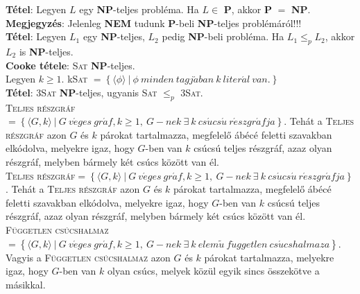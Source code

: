 \documentclass[margin=0px]{article}
\begin{document}
	\noindent \textbf{Tétel}: Legyen $L$ egy \textbf{NP}-teljes probléma. Ha $L \in$ \textbf{P}, akkor \textbf{P} $=$ \textbf{NP}.\\
	
	\noindent \textbf{Megjegyzés}: Jelenleg \textbf{NEM} tudunk \textbf{P}-beli \textbf{NP}-teljes problémáról!!!\\
	
	\noindent \textbf{Tétel}: Legyen $L_{1}$ egy \textbf{NP}-teljes, $L_{2}$ pedig \textbf{NP}-beli probléma.
	Ha $L_{1} \leq_{p} L_{2}$, akkor $L_{2}$ is \textbf{NP}-teljes.\\
	
	\noindent \textbf{Cooke tétele}: \textsc{Sat} \textbf{NP}-teljes.\\
	
	\noindent Legyen $k \geq 1$.
	k\textsc{Sat} $= \left\{\langle \phi \rangle \ | \ \phi \ minden \ tagj\acute{a}ban \ k \ liter\acute{a}l \ van. \right\}$\\
	
	\noindent \textbf{Tétel}: 3\textsc{Sat} \textbf{NP}-teljes, ugyanis \textsc{Sat} $\leq_{p}$ 3\textsc{Sat}.\\
	
	\noindent \textsc{Teljes részgráf} $= \left\{\langle G, k \rangle \ | \ G \ v\acute{e}ges \ gr\acute{a}f, k \geq 1, \ G-nek \ \exists \ k
	\ cs\acute{u}cs\acute{u} \ r\acute{e}szgr\acute{a}fja  \right\}$.
	Tehát a \textsc{Teljes részgráf} azon $G$ és $k$ párokat tartalmazza, megfelelő ábécé feletti
	szavakban elkódolva, melyekre igaz, hogy $G$-ben van $k$ csúcsú teljes részgráf,
	azaz olyan részgráf, melyben bármely két csúcs között van él.\\

	\noindent \textsc{Teljes részgráf}$= \left\{\langle G, k \rangle \ | \ G \ v\acute{e}ges \ gr\acute{a}f, k \geq 1, \ G-nek \ \exists \ k
	\ cs\acute{u}cs\acute{u} \ r\acute{e}szgr\acute{a}fja  \right\}$.
	Tehát a \textsc{Teljes részgráf} azon $G$ és $k$ párokat tartalmazza, megfelelő ábécé feletti
	szavakban elkódolva, melyekre igaz, hogy $G$-ben van $k$ csúcsú teljes részgráf,
	azaz olyan részgráf, melyben bármely két csúcs között van él.\\
	
	\noindent \textsc{Független csúcshalmaz} $= \left\{\langle G, k \rangle \ | \ G \ v\acute{e}ges \ gr\acute{a}f, k \geq 1, \ G-nek \ \exists \ k	\ elem\tilde{u} \ f\ddot{u}ggetlen \ cs\acute{u}cshalmaza  \right\}$.
	Vagyis a  \textsc{Független csúcshalmaz} azon $G$ és $k$ párokat tartalmazza, melyekre
	igaz, hogy $G$-ben van $k$ olyan csúcs, melyek közül egyik sincs összekötve a
	másikkal.\\
	
\end{document}
